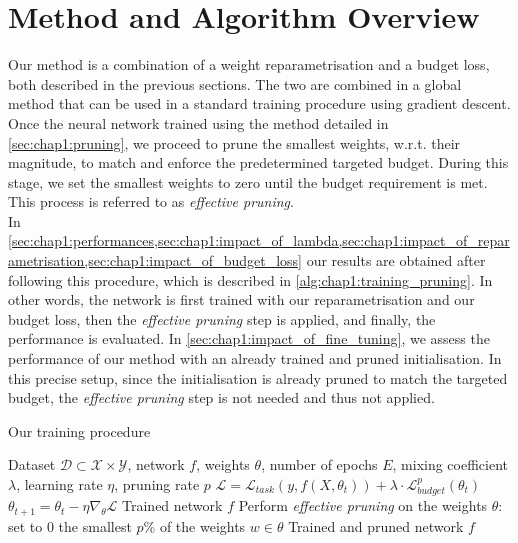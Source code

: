 
\section{Method and Algorithm Overview}
\label{sec:chap1:overview}
Our method is a combination of a weight reparametrisation and a budget loss,
both described in the previous sections. The two are combined in a global method
that can be used in a standard training procedure using gradient descent. Once
the neural network trained using the method detailed in
\cref{sec:chap1:pruning}, we proceed to prune the smallest weights, w.r.t. their
magnitude, to match and enforce the predetermined targeted budget. During this
stage, we set the smallest weights to zero until the budget requirement is met.
This process is referred to as \textit{effective pruning}.\\

In
\cref{sec:chap1:performances,sec:chap1:impact_of_lambda,sec:chap1:impact_of_reparametrisation,sec:chap1:impact_of_budget_loss}
our results are obtained after following this procedure, which is described in
\cref{alg:chap1:training_pruning}. In other words, the network is first trained
with our reparametrisation and our budget loss, then the \textit{effective
  pruning} step is applied, and finally, the performance is evaluated. In
\cref{sec:chap1:impact_of_fine_tuning}, we assess the performance of our method
with an already trained and pruned initialisation. In this precise setup, since
the initialisation is already pruned to match the targeted budget, the
\emph{effective pruning} step is not needed and thus not applied.\\

\begin{algorithm}
  \caption{Our training procedure}
  \label{alg:chap1:training_pruning}
  \begin{algorithmic}
    \REQUIRE Dataset $\mathcal{D} \subset \mathcal{X} \times \mathcal{Y}$, network $f$,
    weights $\theta$, number of epochs $E$, mixing coefficient $\lambda$, learning
    rate $\eta$, pruning rate $p$
    \STATE $\mathcal{L}= \mathcal{L}_{task}(y, f(X, \theta_t)) + \lambda \cdot
      \mathcal{L}^{p}_{budget}(\theta_t )$ 
    \STATE $\theta_{t+1} = \theta_t - \eta \nabla_{\theta} \mathcal{L}$ 
    \ENDFOR
    \ENDFOR
    \RETURN Trained network $f$
    \STATE Perform \emph{effective pruning} on the weights $\theta$: set to 0 the
    smallest $p$\% of the weights $w\in\theta$
    \RETURN Trained and pruned network $f$
  \end{algorithmic}
\end{algorithm}


